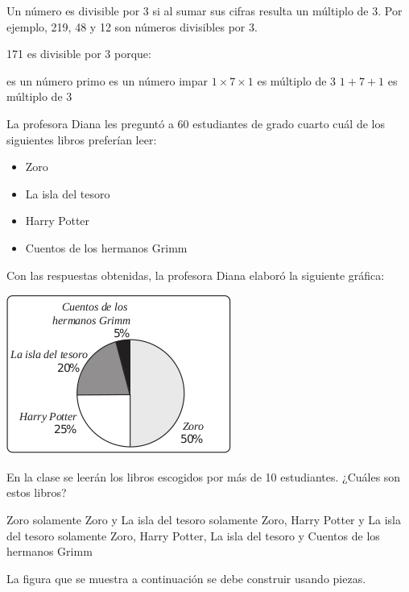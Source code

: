 \documentclass[10pt,addpoints]{exam}
\begin{document}
\begin{multicols}{2}
\begin{questions}
\begin{oneparchoices}
\end{oneparchoices}
\question Un número es divisible por 3 si al sumar sus cifras resulta un múltiplo de 3. Por ejemplo, 219, 48 y 12 son números divisibles por 3.

171 es divisible por 3 porque:
\begin{choices}
 es un número primo
 es un número impar
\choice $1 \times 7 \times 1$ es múltiplo de 3
\CorrectChoice $1+7+1$ es múltiplo de 3
\end{choices}
\question La profesora Diana les preguntó a 60 estudiantes de grado cuarto cuál de los siguientes libros preferían leer:
\begin{itemize}
\item Zoro
\item La isla del tesoro
\item Harry Potter
\item Cuentos de los hermanos Grimm
\end{itemize}
Con las respuestas obtenidas, la profesora Diana elaboró la siguiente gráfica:
\begin{center}
\includegraphics[scale=.7]{Images/Pantallazo-23.png} 
\end{center}
En la clase se leerán los libros escogidos por más de 10 estudiantes. ¿Cuáles son estos libros?
\begin{choices}
\choice Zoro solamente
\choice Zoro y La isla del tesoro solamente
\CorrectChoice Zoro, Harry Potter y La isla del tesoro solamente
\choice Zoro, Harry Potter, La isla del tesoro y Cuentos de los hermanos Grimm
\end{choices}
\question La figura que se muestra a continuación se debe construir usando piezas.
\begin{center}
\end{center}
\end{questions}
\end{multicols}
\end{document}
